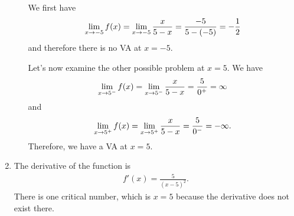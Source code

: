 \begin{enumerate}[label=\textbf{\Alph*.}]
\begin{enumerate}[label=\textbf{(\Roman*)}]
		 We first have
			\begin{align*}
			\lim_{x \rightarrow -5} f(x) = \lim_{x \rightarrow -5} \frac{x}{5 - x} = \frac{-5}{5 - (-5)} = -\frac{1}{2}
			\end{align*}
		and therefore there is no VA at $x = -5$. 
		
		Let's now examine the other possible problem at $x = 5$. We have
			\begin{align*}
			\lim_{x \rightarrow 5^-} f(x) = \lim_{x \rightarrow 5^-} \frac{x}{5 - x} = \frac{5}{0^+} = \infty
			\end{align*}
		and
			\begin{align*}
			\lim_{x \rightarrow 5^+} f(x) = \lim_{x \rightarrow 5^+} \frac{x}{5 - x} = \frac{5}{0^-} = -\infty .
			\end{align*}
		Therefore, we have a VA at $x = 5$.
		\end{enumerate}
	\item The derivative of the function is
		\begin{align*}
		f'(x) = \frac{5}{(x - 5)^2} .
		\end{align*}
	There is one critical number, which is $x = 5$ because the derivative does not exist there.
	

\end{enumerate}
